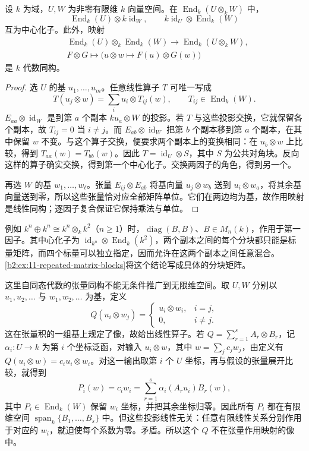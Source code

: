 \begin{proposition}\label{b2:prop:tensor-factor-centralizers}
	设 \(k\) 为域，\(U,W\) 为非零有限维 \(k\) 向量空间。在 \(\operatorname{End}_k(U\otimes_kW)\) 中，
	\[
		\operatorname{End}_k(U)\otimes k\operatorname{id}_W, \qquad k\operatorname{id}_U\otimes\operatorname{End}_k(W)
	\]
	互为中心化子。此外，映射
	\[
		\begin{aligned}
			&\operatorname{End}_k(U)\otimes_k\operatorname{End}_k(W) \longrightarrow\operatorname{End}_k(U\otimes_kW),\\
			&F\otimes G\longmapsto \bigl(u\otimes w\mapsto F(u)\otimes G(w)\bigr)
		\end{aligned}
	\]
	是 \(k\) 代数同构。
\end{proposition}
\begin{proof}
	选 \(U\) 的基 \(u_1,\ldots,u_m\)。任意线性算子 \(T\) 可唯一写成
	\[
		T(u_j\otimes w)=\sum_i u_i\otimes T_{ij}(w), \qquad T_{ij}\in\operatorname{End}_k(W).
	\]
	\(E_{aa}\otimes\operatorname{id}_W\) 是到第 \(a\) 个副本 \(ku_a\otimes W\) 的投影。若 \(T\) 与这些投影交换，它就保留各个副本，故 \(T_{ij}=0\) 当 \(i\ne j\)。而 \(E_{ab}\otimes\operatorname{id}_W\) 把第 \(b\) 个副本移到第 \(a\) 个副本，在其中保留 \(w\) 不变。与这个算子交换，便要求两个副本上的变换相同：在 \(u_b\otimes w\) 上比较，得到 \(T_{aa}(w)=T_{bb}(w)\)。因此 \(T=\operatorname{id}_U\otimes S\)，其中 \(S\) 为公共对角块。反向这样的算子确实交换，得到第一个中心化子。交换两因子的角色，得到另一个。

	再选 \(W\) 的基 \(w_1,\ldots,w_\ell\)。张量 \(E_{ij}\otimes E_{ab}\) 将基向量 \(u_j\otimes w_b\) 送到 \(u_i\otimes w_a\)，将其余基向量送到零，所以这些张量恰对应全部矩阵单位。它们在两边均为基，故作用映射是线性同构；逐因子复合保证它保持乘法与单位。
\end{proof}

例如 \(k^n\oplus k^n\cong k^n\otimes_k k^2\)（\(n\ge1\)）时，\(\operatorname{diag}(B,B)\)、\(B\in M_n(k)\)，作用于第一因子。其中心化子为 \(\operatorname{id}_{k^n}\otimes\operatorname{End}_k(k^2)\)，两个副本之间的每个分块都只能是标量矩阵，而四个标量可以独立指定，因而允许在这两个副本之间任意混合。\cref{b2:ex:11-repeated-matrix-blocks}将这个结论写成具体的分块矩阵。

\ProseParagraphBreak
这里自同态代数的张量同构不能无条件推广到无限维空间。取 \(U,W\) 分别以 \(u_1,u_2,\ldots\) 与 \(w_1,w_2,\ldots\) 为基，定义
\[
	Q(u_i\otimes w_j)=
	\begin{cases}
		u_i\otimes w_i,&i=j,\\
		0,&i\ne j.
	\end{cases}
\]
这在张量积的一组基上规定了像，故给出线性算子。若 \(Q=\sum_{r=1}^s A_r\otimes B_r\)，记 \(\alpha_i:U\to k\) 为第 \(i\) 个坐标泛函，对输入 \(u_i\otimes w\)，其中 \(w=\sum_jc_jw_j\)，由定义有 \(Q(u_i\otimes w)=c_i u_i\otimes w_i\)。对这一输出取第 \(i\) 个 \(U\) 坐标，再与假设的张量展开比较，就得到
\[
	P_i(w)=c_iw_i=\sum_{r=1}^s\alpha_i(A_ru_i)B_r(w),
\]
其中 \(P_i\in\operatorname{End}_k(W)\) 保留 \(w_i\) 坐标，并把其余坐标归零。因此所有 \(P_i\) 都在有限维空间 \(\operatorname{span}_k\{B_1,\ldots,B_s\}\) 中。但这些投影线性无关：任意有限线性关系分别作用于对应的 \(w_i\)，就迫使每个系数为零。矛盾。所以这个 \(Q\) 不在张量作用映射的像中。

